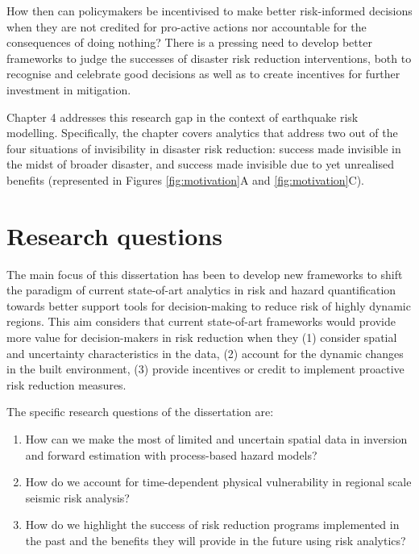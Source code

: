     How then can policymakers be incentivised to make better risk-informed decisions when they are not credited for pro-active actions nor accountable for the consequences of doing nothing? There is a pressing need to develop better frameworks to judge the successes of disaster risk reduction interventions, both to recognise and celebrate good decisions as well as to create incentives for further investment in mitigation.
    
    Chapter 4 addresses this research gap in the context of earthquake risk modelling. Specifically, the chapter covers analytics that address two out of the four situations of invisibility in disaster risk reduction: success made invisible in the midst of broader disaster, and success made invisible due to yet unrealised benefits (represented in Figures \ref{fig:motivation}A and \ref{fig:motivation}C).


\section{Research questions} \label{subsec-int-ques}

The main focus of this dissertation has been to develop new frameworks to shift the paradigm of current state-of-art analytics in risk and hazard quantification towards better support tools for decision-making to reduce risk of highly dynamic regions. This aim considers that current state-of-art frameworks would provide more value for decision-makers in risk reduction when they (1) consider spatial and uncertainty characteristics in the data, (2) account for the dynamic changes in the built environment, (3) provide incentives or credit to implement proactive risk reduction measures.

The specific research questions of the dissertation are:

\begin{enumerate}
    \item How can we make the most of limited and uncertain spatial data in inversion and forward estimation with process-based hazard models? 

    \item How do we account for time-dependent physical vulnerability in regional scale seismic risk analysis?

    \item How do we highlight the success of risk reduction programs implemented in the past and the benefits they will provide in the future using risk analytics?
\end{enumerate}

